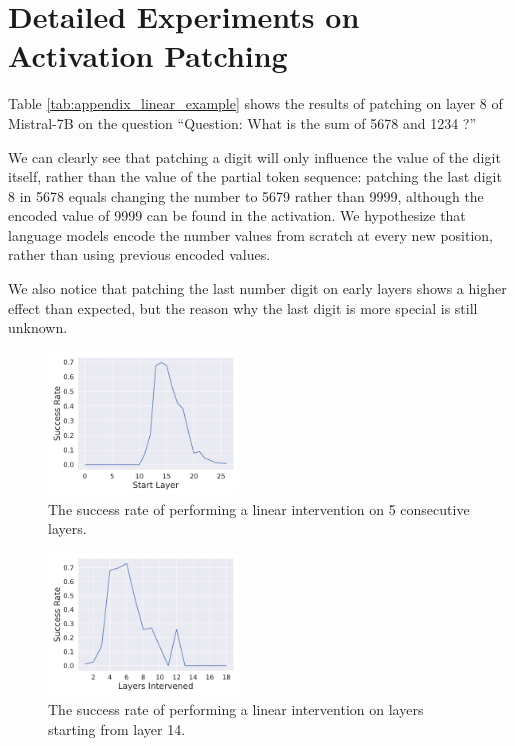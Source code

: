\documentclass[11pt]{article}
\begin{document}
\section{Detailed Experiments on Activation Patching}
\label{sec:appendix_patch}
Table \ref{tab:appendix_linear_example} shows the results of patching on layer 8 of Mistral-7B on the question ``Question: What is the sum of 5678 and 1234 ?''

We can clearly see that patching a digit will only influence the value of the digit itself, rather than the value of the partial token sequence: patching the last digit 8 in 5678 equals changing the number to 5679 rather than 9999, although the encoded value of 9999 can be found in the activation.
We hypothesize that language models encode the number values from scratch at every new position, rather than using previous encoded values.

We also notice that patching the last number digit on early layers shows a higher effect than expected, but the reason why the last digit is more special is still unknown.

\begin{figure}[ht]
    \centering
    \includegraphics[width=0.45\textwidth]{figures/intervene/linear/5_layer.pdf}
    \caption{The success rate of performing a linear intervention on 5 consecutive layers.}
    \label{fig:appendix_linear_5}
\end{figure}

\begin{figure}[ht]
    \centering
    \includegraphics[width=0.45\textwidth]{figures/intervene/linear/14_start.pdf}
    \caption{The success rate of performing a linear intervention on layers starting from layer 14.}
    \label{fig:appendix_linear_14}
\end{figure}
\end{document}
